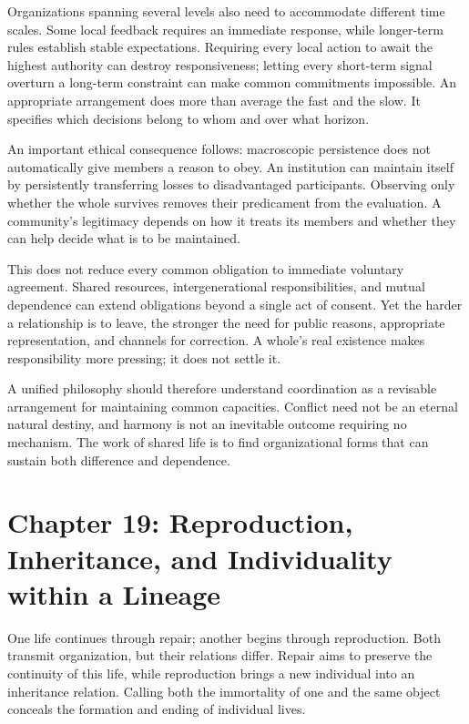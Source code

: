 \documentclass[
  english,
  11pt,
  oneside]{book}
\begin{document}
Organizations spanning several levels also need to accommodate different time scales. Some local feedback requires an immediate response, while longer-term rules establish stable expectations. Requiring every local action to await the highest authority can destroy responsiveness; letting every short-term signal overturn a long-term constraint can make common commitments impossible. An appropriate arrangement does more than average the fast and the slow. It specifies which decisions belong to whom and over what horizon.

An important ethical consequence follows: macroscopic persistence does not automatically give members a reason to obey. An institution can maintain itself by persistently transferring losses to disadvantaged participants. Observing only whether the whole survives removes their predicament from the evaluation. A community's legitimacy depends on how it treats its members and whether they can help decide what is to be maintained.

This does not reduce every common obligation to immediate voluntary agreement. Shared resources, intergenerational responsibilities, and mutual dependence can extend obligations beyond a single act of consent. Yet the harder a relationship is to leave, the stronger the need for public reasons, appropriate representation, and channels for correction. A whole's real existence makes responsibility more pressing; it does not settle it.

\begingroup{}

A unified philosophy should therefore understand coordination as a revisable arrangement for maintaining common capacities. Conflict need not be an eternal natural destiny, and harmony is not an inevitable outcome requiring no mechanism. The work of shared life is to find organizational forms that can sustain both difference and dependence.

\par\endgroup

\chapter{Chapter 19: Reproduction, Inheritance, and Individuality within a Lineage}\label{ph-ch-19}

One life continues through repair; another begins through reproduction. Both transmit organization, but their relations differ. Repair aims to preserve the continuity of this life, while reproduction brings a new individual into an inheritance relation. Calling both the immortality of one and the same object conceals the formation and ending of individual lives.
\end{document}

